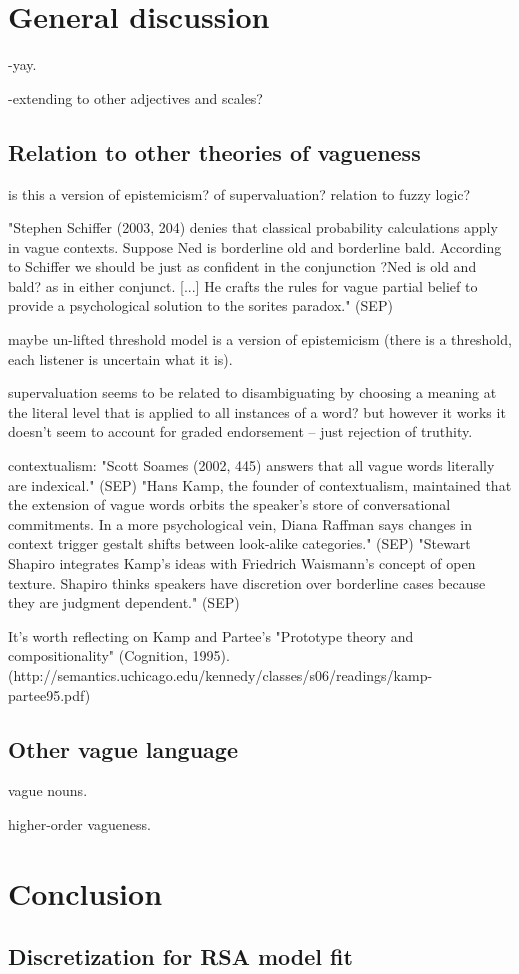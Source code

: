 \documentclass[11pt]{amsart}
\begin{document}
\section{General discussion}
\label{gd}

  -yay. 
  
  -extending to other adjectives and scales?
  
 \subsection{Relation to other theories of vagueness}
  
is this a version of epistemicism? of supervaluation? relation to fuzzy logic?

"Stephen Schiffer (2003, 204) denies that classical probability calculations apply in vague contexts. Suppose Ned is borderline old and borderline bald. According to Schiffer we should be just as confident in the conjunction ?Ned is old and bald? as in either conjunct. [...] He crafts the rules for vague partial belief to provide a psychological solution to the sorites paradox." (SEP)
  
 maybe un-lifted threshold model is a version of epistemicism (there is a threshold, each listener is uncertain what it is).
 
supervaluation seems to be related to disambiguating by choosing a meaning at the literal level that is applied to all instances of a word? but however it works it doesn't seem to account for graded endorsement -- just rejection of truthity.

contextualism: "Scott Soames (2002, 445) answers that all vague words literally are indexical." (SEP)
"Hans Kamp, the founder of contextualism, maintained that the extension of vague words orbits the speaker's store of conversational commitments. In a more psychological vein, Diana Raffman says changes in context trigger gestalt shifts between look-alike categories." (SEP)
"Stewart Shapiro integrates Kamp's ideas with Friedrich Waismann's concept of open texture. Shapiro thinks speakers have discretion over borderline cases because they are judgment dependent." (SEP)

It's worth reflecting on Kamp and Partee's "Prototype theory and compositionality" (Cognition, 1995). (http://semantics.uchicago.edu/kennedy/classes/s06/readings/kamp-partee95.pdf)
  
\subsection{Other vague language}

vague nouns. 

higher-order vagueness.

\section{Conclusion}


\begin{appendix}
\section{Discretization for RSA model fit}
\end{appendix}
\end{document}
